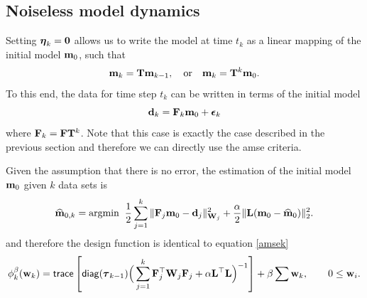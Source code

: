 \documentclass[leqno,onefignum,onetabnum]{siamltexmm}
\newcommand{\bfF}	{{\bf{F}}}
\newcommand{\bfI}	{{\bf{I}}}
\newcommand{\bfL}	{{\bf{L}}}
\newcommand{\bfT}	{{\bf{T}}}
\newcommand{\bfW}	{{\bf{W}}}
\newcommand{\bfd}	{{\bf{d}}}
\newcommand{\bfe}	{{\bf{e}}}
\newcommand{\bfm}	{{\bf{m}}}
\newcommand{\bfw}	{{\bf{w}}}
\newcommand{\hf}        {{\frac 12}}
\newcommand{\bfepsilon} {{\boldsymbol \epsilon}}
\newcommand{\bfeta}     {{\boldsymbol \eta}}
\newcommand{\bftau}      {{\boldsymbol \tau}}
\newcommand {\zero}  {{\bf 0}}
\renewcommand{\hf}		 {\frac12}
\newcommand{\bfmhat}    {{\widehat{\bfm}}}
\newcommand{\LtL}       { \bfL^{\top}\bfL}
\begin{document}
\subsection{Noiseless model dynamics}

Setting $\bfeta_k = \zero$ allows us to 
write the model at time $t_k$ as a linear mapping of the initial model $\bfm_0$, such that
\begin{align*}
\bfm_{k} = \bfT\bfm_{k-1}, \quad {\rm or } \quad
\bfm_{k} = \bfT^{k}\bfm_0.
\end{align*} 
To this end, the data for time step $t_k$ can be written in terms of the initial model 
\begin{equation}
\bfd_k = \bfF_k\bfm_0 + \bfepsilon_k
\end{equation}
where $\bfF_k = \bfF\bfT^{k}$.
Note that this case is exactly the case described in the previous section and therefore we can
directly use the amse criteria.

Given the assumption that there is no error, the estimation of the initial model $\bfm_0$ given $k$ data sets is 
\begin{equation}
\label{m0NoNoise}
\bfmhat_{0,k} ={\rm argmin } \;\; \hf  \sum_{j=1}^{k}\| \bfF_{j}\bfm_0 - \bfd_j \|_{\bfW_j}^2 + \frac{\alpha}{2}\|\bfL(\bfm_0 - \bfmhat_{0})\|_2^2.
\end{equation}
and therefore the design function is identical to equation \eqref{amsek}
\begin{align}
\phi_{k}^{\beta}(\bfw_{k}) =  {\sf trace} \left[  {\sf diag}(\bftau_{k-1}) \Big(\sum_{j=1}^{k}\bfF_{j}^{\top}\bfW_{j}\bfF_{j}   +
\alpha \LtL\Big)^{-1} \right] + \beta \sum \bfw_{k},\quad \quad 0 \le \bfw_i.
\end{align}

\end{document}
